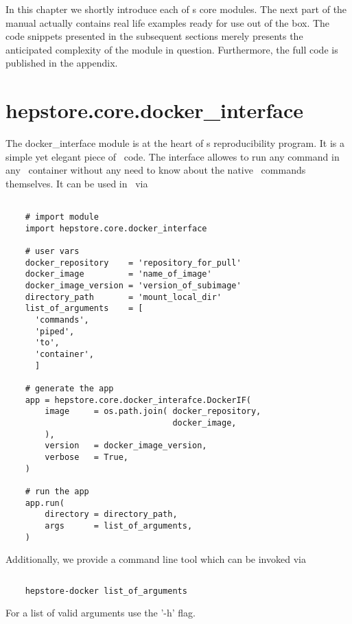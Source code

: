 
In this chapter we shortly introduce each of \hepstore s core
modules. The next part of the manual actually contains real life
examples ready for use out of the box. The code snippets presented in
the subsequent sections merely presents the anticipated complexity of
the module in question. Furthermore, the full code is published in the
appendix.

\section{hepstore.core.docker\_interface}

The docker\_interface module is at the heart of \hepstore s
reproducibility program. It is a simple yet elegant piece of
\python~code. The interface allowes to run any command in any
\docker~container without any need to know about the native
\docker~commands themselves. It can be used in \python~via
%
\begin{changemargin}{1.5cm}{1.5cm}
  \centering
  \begin{lstlisting}
    
    # import module
    import hepstore.core.docker_interface

    # user vars
    docker_repository    = 'repository_for_pull'
    docker_image         = 'name_of_image'
    docker_image_version = 'version_of_subimage'
    directory_path       = 'mount_local_dir'
    list_of_arguments    = [
      'commands',
      'piped',
      'to',
      'container',
      ]
    
    # generate the app
    app = hepstore.core.docker_interafce.DockerIF(    
        image     = os.path.join( docker_repository,
                                  docker_image,
        ),
        version   = docker_image_version,
        verbose   = True,
    )

    # run the app
    app.run(
        directory = directory_path,
        args      = list_of_arguments,
    )
  \end{lstlisting}
\end{changemargin}
%
Additionally, we provide a command line tool which can be invoked via
%
\begin{changemargin}{1.5cm}{1.5cm}
  \centering
  \begin{lstlisting}[language=Bash]
    
    hepstore-docker list_of_arguments
  \end{lstlisting}
\end{changemargin}
%
For a list of valid arguments use the '-h' flag.


